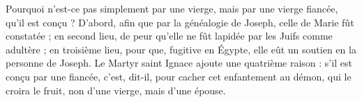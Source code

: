 Pourquoi n’est-ce pas simplement par une vierge, mais par une vierge fiancée, qu’il est conçu ? D’abord, afin que par la généalogie de Joseph, celle de Marie fût constatée ; en second lieu, de peur qu’elle ne fût lapidée par les Juifs comme adultère ; en troisième lieu, pour que, fugitive en Égypte, elle eût un soutien en la personne de Joseph. Le Martyr saint Ignace ajoute une quatrième raison : s’il est conçu par une fiancée, c’est, dit-il, pour cacher cet enfantement au démon, qui le croira le fruit, non d’une vierge, mais d’une épouse.